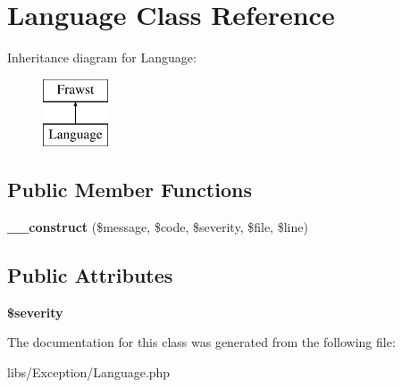 \hypertarget{classLanguage}{
\section{Language Class Reference}
\label{classLanguage}
}
Inheritance diagram for Language:\begin{figure}[H]
\begin{center}
\leavevmode
\includegraphics[height=2.000000cm]{classLanguage}
\end{center}
\end{figure}
\subsection*{Public Member Functions}
\begin{DoxyCompactItemize}
\item 
\hypertarget{classLanguage_aef959d5bc3a037220968ede228e9c8aa}{
{\bfseries \_\-\_\-construct} (\$message, \$code, \$severity, \$file, \$line)}
\label{classLanguage_aef959d5bc3a037220968ede228e9c8aa}

\end{DoxyCompactItemize}
\subsection*{Public Attributes}
\begin{DoxyCompactItemize}
\item 
\hypertarget{classLanguage_a2c142670d03c9e998b1223638fbbba3d}{
{\bfseries \$severity}}
\label{classLanguage_a2c142670d03c9e998b1223638fbbba3d}

\end{DoxyCompactItemize}


The documentation for this class was generated from the following file:\begin{DoxyCompactItemize}
\item 
libs/Exception/Language.php\end{DoxyCompactItemize}
